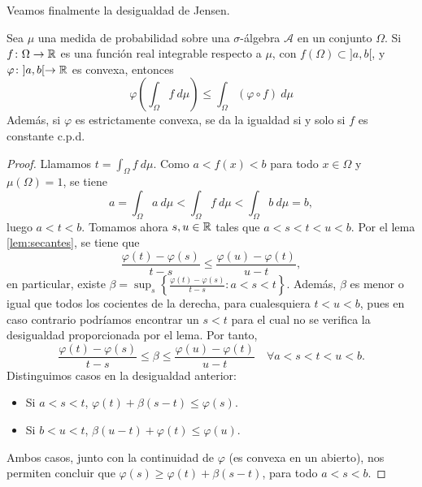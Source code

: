 Veamos finalmente la desigualdad de Jensen.

\begin{thm} \label{thm:desig_jensen}
    Sea $\mu$ una medida de probabilidad sobre una $\sigma$-álgebra $\mathcal{A}$ en un conjunto $\Omega$. Si $f\colon \Omega \to \mathbb{R}$ es una función real integrable respecto a $\mu$, con $f(\Omega) \subset ]a,b[$, y $\varphi\colon ]a,b[ \to \mathbb{R}$ es convexa, entonces
    \begin{equation}
        \varphi\left(\int_{\Omega}f\ d\mu\right) \le \int_{\Omega}(\varphi \circ f)\ d\mu
    \end{equation}
    Además, si $\varphi$ es estrictamente convexa, se da la igualdad si y solo si $f$ es constante c.p.d.
\end{thm}

\begin{proof}
    Llamamos $t = \int_{\Omega} f\ d\mu$. Como $a < f(x) < b$ para todo $x \in \Omega$ y $\mu(\Omega) = 1$, se tiene
    \[a = \int_{\Omega} a \ d\mu < \int_{\Omega}f\ d\mu < \int_{\Omega} b \ d\mu = b, \]
    luego $a < t < b$. Tomamos ahora $s,u \in \mathbb{R}$ tales que $a < s < t < u < b$. Por el lema \ref{lem:secantes}, se tiene que
    \[ \frac{\varphi(t)- \varphi(s)}{t-s} \le \frac{\varphi(u) - \varphi(t)}{u-t}, \]
    en particular, existe $\beta = \sup_{s} \left\{ \frac{\varphi(t)-\varphi(s)}{t-s} \colon a < s < t \right\}$. Además, $\beta$ es menor o igual que todos los cocientes de la derecha, para cualesquiera $t < u < b$, pues en caso contrario podríamos encontrar un $s < t$ para el cual no se verifica la desigualdad proporcionada por el lema. Por tanto,
    \begin{equation}
        \frac{\varphi(t)-\varphi(s)}{t-s} \le \beta \le \frac{\varphi(u) - \varphi(t)}{u-t} \quad \forall a < s < t < u < b.
    \end{equation}
    Distinguimos casos en la desigualdad anterior:
    \begin{itemize}
        \item Si $a < s < t$, $\varphi(t) + \beta (s-t) \le \varphi(s)$.
        \item Si $b < u < t$, $\beta(u-t) + \varphi(t) \le \varphi(u)$.
    \end{itemize}
    Ambos casos, junto con la continuidad de $\varphi$ (es convexa en un abierto), nos permiten concluir que $\varphi(s) \ge \varphi(t) + \beta(s-t)$, para todo $a < s < b$.


\end{proof}
